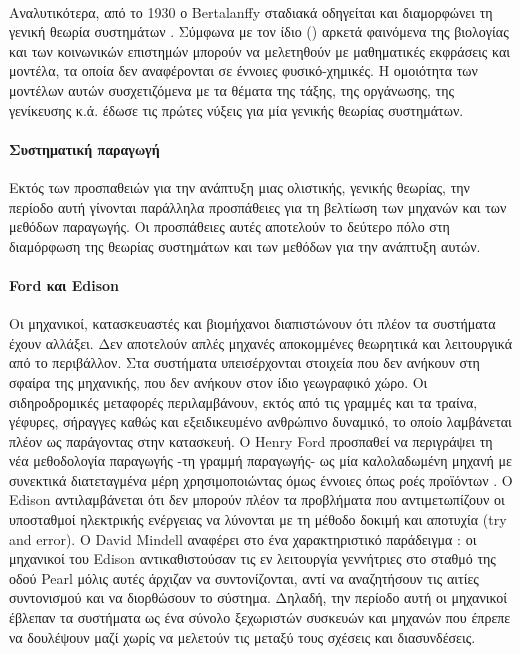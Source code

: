 \documentclass[a4paper,12pt,twoside]{report}
\begin{document}
{			\paragraph{}{Αναλυτικότερα, από το 1930 ο Bertalanffy σταδιακά οδηγείται και διαμορφώνει τη γενική θεωρία συστημάτων \cite[σελ. 411]{TheHistoryΑndStatusΟfGeneralSystemsTheory:Bertalanffy}. Σύμφωνα με τον ίδιο (\cite[σελ. 13]{GeneralSystemsTheory:Bertalanffy1972}) αρκετά φαινόμενα της βιολογίας και των κοινωνικών επιστημών μπορούν να μελετηθούν με μαθηματικές εκφράσεις και μοντέλα, τα οποία δεν αναφέρονται σε έννοιες φυσικό-χημικές. Η ομοιότητα των μοντέλων αυτών συσχετιζόμενα με τα θέματα της τάξης, της οργάνωσης, της γενίκευσης κ.ά. έδωσε τις πρώτες νύξεις για μία γενικής θεωρίας συστημάτων.
			}
			
			\paragraph{Συστηματική παραγωγή}{Εκτός των προσπαθειών για την ανάπτυξη μιας ολιστικής, γενικής θεωρίας, την περίοδο αυτή γίνονται παράλληλα προσπάθειες για τη βελτίωση των μηχανών και των μεθόδων παραγωγής. Οι προσπάθειες αυτές αποτελούν το δεύτερο πόλο στη διαμόρφωση της θεωρίας συστημάτων και των μεθόδων για την ανάπτυξη αυτών.
			}
			\paragraph{Ford και Edison}{Οι μηχανικοί, κατασκευαστές και βιομήχανοι διαπιστώνουν ότι πλέον τα συστήματα έχουν αλλάξει. Δεν αποτελούν απλές μηχανές αποκομμένες θεωρητικά και λειτουργικά από το περιβάλλον. Στα συστήματα υπεισέρχονται στοιχεία που δεν ανήκουν στη σφαίρα της μηχανικής, που δεν ανήκουν στον ίδιο γεωγραφικό χώρο. Οι σιδηροδρομικές μεταφορές περιλαμβάνουν, εκτός από τις γραμμές και τα τραίνα, γέφυρες, σήραγγες καθώς και εξειδικευμένο ανθρώπινο δυναμικό, το οποίο λαμβάνεται πλέον ως παράγοντας στην κατασκευή. O Henry Ford προσπαθεί να περιγράψει τη νέα μεθοδολογία παραγωγής -τη γραμμή παραγωγής- ως μία καλολαδωμένη μηχανή με συνεκτικά διατεταγμένα μέρη χρησιμοποιώντας όμως έννοιες όπως ροές προϊόντων \cite[σελ. 6]{HistoricalPerspectivesOnSystemsThinkingInEngineering}. Ο Edison αντιλαμβάνεται ότι δεν μπορούν πλέον τα προβλήματα που αντιμετωπίζουν οι υποσταθμοί ηλεκτρικής ενέργειας να λύνονται με τη μέθοδο δοκιμή και αποτυχία (try and error).  O David Mindell αναφέρει στο \cite[σελ. 7]{HistoricalPerspectivesOnSystemsThinkingInEngineering} ένα χαρακτηριστικό παράδειγμα : οι μηχανικοί του Edison αντικαθιστούσαν τις εν λειτουργία γεννήτριες στο σταθμό της οδού Pearl μόλις αυτές άρχιζαν να συντονίζονται, αντί  να αναζητήσουν τις αιτίες συντονισμού και να διορθώσουν το σύστημα. Δηλαδή, την περίοδο αυτή οι μηχανικοί έβλεπαν τα συστήματα ως ένα σύνολο ξεχωριστών συσκευών και μηχανών που έπρεπε να δουλέψουν μαζί χωρίς να μελετούν τις μεταξύ τους σχέσεις και διασυνδέσεις.
			}
}
\end{document}
